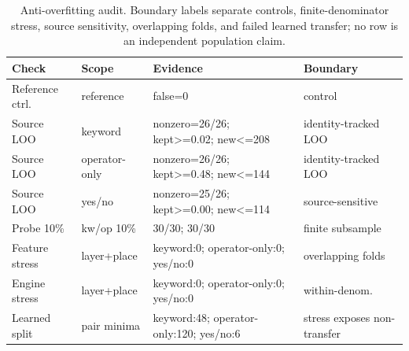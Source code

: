 \begin{table}[t]
\centering
\caption{Anti-overfitting audit. Boundary labels separate controls, finite-denominator stress, source sensitivity, overlapping folds, and failed learned transfer; no row is an independent population claim.}
\label{tab:anti-overfit-audit}
\footnotesize
\setlength{\tabcolsep}{2.0pt}
\begin{tabular}{@{}p{0.60in}p{0.62in}p{0.92in}p{1.03in}@{}}
\toprule
Check & Scope & Evidence & Boundary \\
\midrule
Reference ctrl. & reference & false=0 & control \\
Source LOO & keyword & nonzero=26/26; kept>=0.02; new<=208 & identity-tracked LOO \\
Source LOO & operator-only & nonzero=26/26; kept>=0.48; new<=144 & identity-tracked LOO \\
Source LOO & yes/no & nonzero=25/26; kept>=0.00; new<=114 & source-sensitive \\
Probe 10\% & kw/op 10\% & 30/30; 30/30 & finite subsample \\
Feature stress & layer+place & keyword:0; operator-only:0; yes/no:0 & overlapping folds \\
Engine stress & layer+place & keyword:0; operator-only:0; yes/no:0 & within-denom. \\
Learned split & pair minima & keyword:48; operator-only:120; yes/no:6 & stress exposes non-transfer \\
\bottomrule
\end{tabular}
\end{table}
